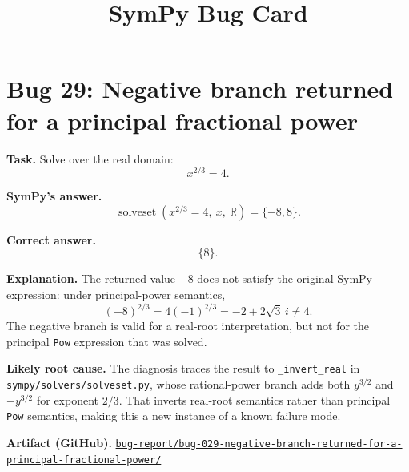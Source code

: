 \documentclass[11pt]{article}
\title{SymPy Bug Card}
\author{}
\date{}
\newcommand{\artifactrepo}{https://github.com/TODO-org/TODO-repo}
\newcommand{\bugbundle}[1]{\href{\artifactrepo/tree/main/bug-report/#1}{\nolinkurl{bug-report/#1/}}}
\begin{document}
\maketitle

\section*{Bug 29: Negative branch returned for a principal fractional power}

\begin{counterexamplebox}
\textbf{Task.} Solve over the real domain:
\[
    x^{2/3}=4.
\]

\medskip
\textbf{SymPy's answer.}
\[
    \operatorname{solveset}(x^{2/3}=4,\ x,\ \mathbb{R})=\{-8,8\}.
\]

\medskip
\textbf{Correct answer.}
\[
    \{8\}.
\]

\medskip
\textbf{Explanation.} The returned value \(-8\) does not satisfy the original SymPy expression: under principal-power semantics,
\[
    (-8)^{2/3}=4(-1)^{2/3}=-2+2\sqrt{3}\,i \ne 4.
\]
The negative branch is valid for a real-root interpretation, but not for the principal \texttt{Pow} expression that was solved.

\medskip
\textbf{Likely root cause.} The diagnosis traces the result to \texttt{\_invert\_real} in \nolinkurl{sympy/solvers/solveset.py}, whose rational-power branch adds both \(y^{3/2}\) and \(-y^{3/2}\) for exponent \(2/3\). That inverts real-root semantics rather than principal \texttt{Pow} semantics, making this a new instance of a known failure mode.

\medskip
\textbf{Artifact (GitHub).} \bugbundle{bug-029-negative-branch-returned-for-a-principal-fractional-power}
\end{counterexamplebox}
\end{document}
